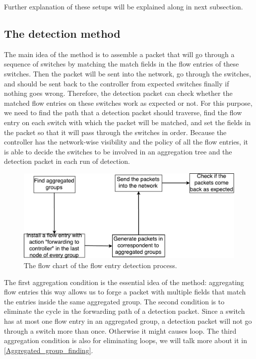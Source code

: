 Further explanation of these setups will be explained along in next subsection.

\subsection{The detection method}
\label{Detection_method}

The main idea of the method is to assemble a packet that will go through a sequence of switches by matching the match fields in the flow entries of these switches. Then the packet will be sent into the network, go through the switches, and should be sent back to the controller from expected switches finally if nothing goes wrong. Therefore, the detection packet can check whether the matched flow entries on these switches work as expected or not. For this purpose, we need to find the path that a detection packet should traverse, find the flow entry on each switch with which the packet will be matched, and set the fields in the packet so that it will pass through the switches in order. Because the controller has the network-wise visibility and the policy of all the flow entries, it is able to decide the switches to be involved in an aggregation tree and the detection packet in each run of detection. 

\begin{figure}[H]
\begin{center} 
\includegraphics[width=1\textwidth]{figures/flow_entry_detection_flowchart.pdf}
\end{center}
\caption{The flow chart of the flow entry detection process.}
\label{flow_entry_detection_flowchart}
\end{figure}

The first aggregation condition is the essential idea of the method: aggregating flow entries this way allows us to forge a packet with multiple fields that match the entries inside the same aggregated group. The second condition is to eliminate the cycle in the forwarding path of a detection packet. Since a switch has at most one flow entry in an aggregated group, a detection packet will not go through a switch more than once. Otherwise it might causes loop. The third aggregation condition is also for eliminating loops, we will talk more about it in \ref{Aggregated_group_finding}.

